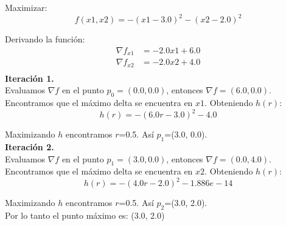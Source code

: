 \documentclass{article}
\title{}
\author{}
\date{}
\begin{document}
\decimalpoint
Maximizar:
$$f(x1, x2)=-(x1 - 3.0)^2 - (x2 - 2.0)^2$$

Derivando la función:
\begin{align*}
\nabla f_{x1} & = -2.0x1 + 6.0\\
\nabla f_{x2} & = -2.0x2 + 4.0\\
\end{align*}
\textbf{Iteración 1.}\\
Evaluamos $\nabla f$ en el punto $p_{0}=(0.0, 0.0)$, entonces $\nabla f =(6.0, 0.0)$. Encontramos que el máximo delta se encuentra en $x1$. Obteniendo $h(r)$:
$$h(r)=-(6.0r - 3.0)^2 - 4.0$$

Maximizando $h$ encontramos $r$=0.5.			Así $p_{1}$=(3.0, 0.0).$$$$
\textbf{Iteración 2.}\\
Evaluamos $\nabla f$ en el punto $p_{1}=(3.0, 0.0)$, entonces $\nabla f =(0.0, 4.0)$. Encontramos que el máximo delta se encuentra en $x2$. Obteniendo $h(r)$:
$$h(r)=-(4.0r - 2.0)^2 - 1.886e-14$$

Maximizando $h$ encontramos $r$=0.5.			Así $p_{2}$=(3.0, 2.0).$$$$
Por lo tanto el punto máximo es: (3.0, 2.0)
\end{document}
